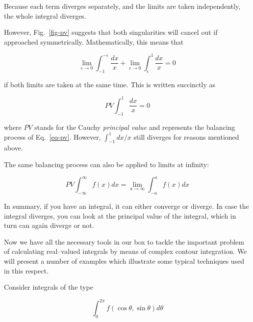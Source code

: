 Because each term diverges separately, and the limits are taken independently, the whole integral diverges. 

However, Fig.~\ref{fig-pv} suggests that both singularities will cancel out if approached symmetrically. Mathematically, this means that

\begin{equation}
\lim_{\epsilon \to 0} \int_{-1}^{-\epsilon} \frac{dx}{x} + \lim_{\epsilon \to 0}
\int_{\epsilon}^1 \frac{dx}{x} = 0 \label{eq-pv}
\end{equation}  

if both limits are taken at the same time. This is written succinctly as

\begin{equation}
PV \int_{-1}^1 \frac{dx}{x} = 0
\end{equation} 

where $PV$ stands for the Cauchy \emph{principal value} and represents the balancing process of Eq.~\ref{eq-pv}. However, $\int_{-1}^1 dx / x$ still diverges for reasons mentioned above.

The same balancing process can also be applied to limits at infinity:

\begin{equation}
PV \int_{-\infty}^\infty f(x) dx = \lim_{a \to \infty} \int_{-a}^{a} f(x) dx
\end{equation} 

In summary, if you have an integral, it can either converge or diverge. In case the integral diverges, you can look at the principal value of the integral, which in turn can again diverge or not.

\pagebreak


Now we have all the necessary tools in our box to tackle the important problem
of calculating real--valued integrals by means of complex contour integration.
We will present a number of examples which illustrate some typical techniques
used in this respect.


Consider integrals of the type

\begin{equation}
\int_0^{2 \pi} f(\cos \theta, \sin \theta) d \theta \label{eq-cont-int-1}
\end{equation} 

